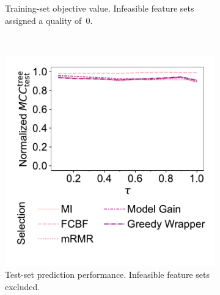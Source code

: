 \documentclass{article}
\theoremstyle{definition}
\begin{document}
\begin{figure}[p]
\begin{subfigure}[t]{0.48\textwidth}
		\caption{
			Training-set objective value.
			Infeasible feature sets assigned a quality of~0.
		}
		\label{fig:afs:impact-tau-fs-method-train-objective-max-fillna}
	\end{subfigure}
	\\ \vspace{\baselineskip}
	\begin{subfigure}[t]{0.48\textwidth}
		\centering
		\includegraphics[width=\textwidth, trim=20 35 15 15, clip]{plots/afs-impact-tau-fs-method-decision-tree-test-mcc-max.pdf}
		\caption{
			Test-set prediction performance.
			Infeasible feature sets excluded.
		}
		\label{fig:afs:impact-tau-fs-method-decision-tree-test-mcc-max}
	\end{subfigure}
	\hfill
	\begin{subfigure}[t]{0.48\textwidth}
		\centering

\end{subfigure}
\end{figure}
\end{document}
